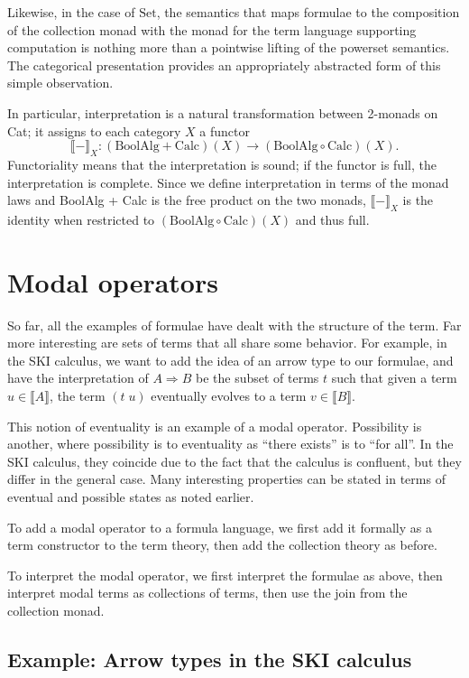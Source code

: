 \documentclass{llncs}
\newcommand{\interp}[1]{\llbracket #1 \rrbracket}
\newcommand{\maps}{\colon}
\newcommand{\Set}{\mathrm{Set}}
\newcommand{\Calc}{\mathrm{Calc}}
\newcommand{\BoolAlg}{\mathrm{BoolAlg}}
\begin{document}
Likewise, in the case of $\Set$, the semantics that maps formulae to
the composition of the collection monad with the monad for the term
language supporting computation is nothing more than a pointwise
lifting of the powerset semantics.  The categorical presentation
provides an appropriately abstracted form of this simple observation.

In particular, interpretation is a natural transformation between 2-monads on Cat; it assigns to each category $X$ a functor 
\[\interp{-}_X\maps (\BoolAlg + \Calc)(X) \to (\BoolAlg \circ \Calc)(X).\]
Functoriality means that the interpretation is sound; if the functor is full, the interpretation is complete. Since we define interpretation in terms of the monad laws and BoolAlg + Calc is the free product on the two monads, $\interp{-}_X$ is the identity when restricted to $(\BoolAlg \circ \Calc)(X)$ and thus full.



\section{Modal operators}

So far, all the examples of formulae have dealt with the structure of the term.  Far more interesting are sets of terms that all share some behavior.  For example, in the SKI calculus, we want to add the idea of an arrow type to our formulae, and have the interpretation of $A \Rightarrow B$ be the subset of terms $t$ such that given a term $u\in\interp{A}$, the term $(t\; u)$ eventually evolves to a term $v\in\interp{B}.$

This notion of eventuality is an example of a modal operator.  Possibility is another, where possibility is to eventuality as ``there exists'' is to ``for all''.  In the SKI calculus, they coincide due to the fact that the calculus is confluent, but they differ in the general case.  Many interesting properties can be stated in terms of eventual and possible states as noted earlier.

To add a modal operator to a formula language, we first add it formally as a term constructor to the term theory, then add the collection theory as before.  

To interpret the modal operator, we first interpret the formulae as above, then interpret modal terms as collections of terms, then use the join from the collection monad.

\subsection{Example: Arrow types in the SKI calculus}
\end{document}
